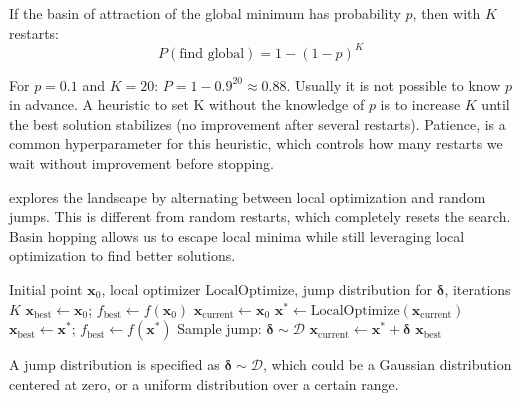 
If the basin of attraction of the global minimum has probability $p$, then with $K$ restarts:
\begin{equation}
    P(\text{find global}) = 1 - (1-p)^K
\end{equation}

For $p = 0.1$ and $K = 20$: $P = 1 - 0.9^{20} \approx 0.88$. Usually it is not possible to know $p$ in advance.
A heuristic to set K without the knowledge of $p$ is to increase $K$ until the best solution stabilizes (no improvement after several restarts).
Patience, is a common hyperparameter for this heuristic, which controls how many restarts we wait without improvement before stopping.


\vspace{1em}
 explores the landscape by alternating between local optimization and random jumps. 
This is different from random restarts, which completely resets the search. Basin hopping allows us to escape local minima while still leveraging local optimization to find better solutions.



\begin{algorithm}[H]
\caption{Basin Hopping}
\begin{algorithmic}[1]
    \Require Initial point $\mathbf{x}_0$, local optimizer $\text{LocalOptimize}$, jump distribution for $\boldsymbol{\delta}$, iterations $K$
    \State $\mathbf{x}_{\text{best}} \gets \mathbf{x}_0$; $f_{\text{best}} \gets f(\mathbf{x}_0)$
    \State $\mathbf{x}_{\text{current}} \gets \mathbf{x}_0$
        \State $\mathbf{x}^* \gets \text{LocalOptimize}(\mathbf{x}_{\text{current}})$
            \State $\mathbf{x}_{\text{best}} \gets \mathbf{x}^*$; $f_{\text{best}} \gets f(\mathbf{x}^*)$
        \EndIf
        \State Sample jump: $\boldsymbol{\delta} \sim \mathcal{D}$
        \State $\mathbf{x}_{\text{current}} \gets \mathbf{x}^* + \boldsymbol{\delta}$ 
    \EndFor
    \State \Return $\mathbf{x}_{\text{best}}$
\end{algorithmic}
\end{algorithm}

A jump distribution is specified as $\boldsymbol{\delta} \sim \mathcal{D}$, which could be a Gaussian distribution centered at zero, or a uniform distribution over a certain range.


